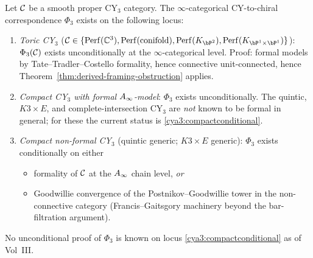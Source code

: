 \begin{theorem}
\label{thm:gelfand-cya3-scope}
\ClaimStatusDerivation{}
Let $\mathcal{C}$ be a smooth proper CY$_3$ category. The
$\infty$-categorical CY-to-chiral correspondence $\Phi_3$ exists
on the following locus:
\begin{enumerate}[label=\textup{(\roman*)}]
\item\label{cya3:toric} \emph{Toric CY$_3$}
($\cC \in \{\Perf(\C^3), \Perf(\mathrm{conifold}),
 \Perf(K_{\bP^2}), \Perf(K_{\bP^1 \times \bP^1})\}$): $\Phi_3(\mathcal{C})$
exists unconditionally at the $\infty$-categorical level.
Proof: formal models by Tate--Tradler--Costello formality, hence
connective unit-connected, hence Theorem~\ref{thm:derived-framing-obstruction}
applies.

\item\label{cya3:compactformal} \emph{Compact CY$_3$ with formal
$A_\infty$-model}: $\Phi_3$ exists unconditionally.  The quintic,
$K3 \times E$, and complete-intersection CY$_3$ are \emph{not} known
to be formal in general; for these the current status is
\ref{cya3:compactconditional}.

\item\label{cya3:compactconditional} \emph{Compact non-formal
CY$_3$} (quintic generic; $K3 \times E$ generic): $\Phi_3$ exists
conditionally on either
\begin{itemize}
\item[$(*)$] formality of $\mathcal{C}$ at the $A_\infty$ chain level, \emph{or}
\item[$(**)$] Goodwillie convergence of the Postnikov--Goodwillie
tower in the non-connective category (Francis--Gaitsgory machinery
beyond the bar-filtration argument).
\end{itemize}
\end{enumerate}
No unconditional proof of $\Phi_3$ is known on locus
\ref{cya3:compactconditional} as of Vol~III.
\end{theorem}

